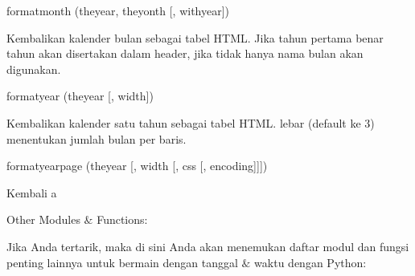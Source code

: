 \vspace{12pt}
\noindent 
formatmonth (theyear, theyonth [, withyear]) \par
\noindent 
Kembalikan kalender bulan sebagai tabel HTML. Jika tahun pertama benar tahun akan disertakan dalam header, jika tidak hanya nama bulan akan digunakan. \par
\vspace{12pt}
\noindent 
formatyear (theyear [, width]) \par
\noindent 
Kembalikan kalender satu tahun sebagai tabel HTML. lebar (default ke 3) menentukan jumlah bulan per baris. \par
\vspace{12pt}
\noindent 
formatyearpage (theyear [, width [, css [, encoding]]]) \par
\noindent 
Kembali a \par
\vspace{12pt}
\noindent 
{\fontsize{16pt}{16pt}\selectfont Other Modules  $  \&  $ Functions: \\} \par
\noindent 
Jika Anda tertarik, maka di sini Anda akan menemukan daftar modul dan fungsi penting lainnya untuk bermain dengan tanggal  $  \&  $ waktu dengan Python: \par
\vspace{12pt}
\vspace{12pt}
\vspace{12pt}
\vspace{12pt}


